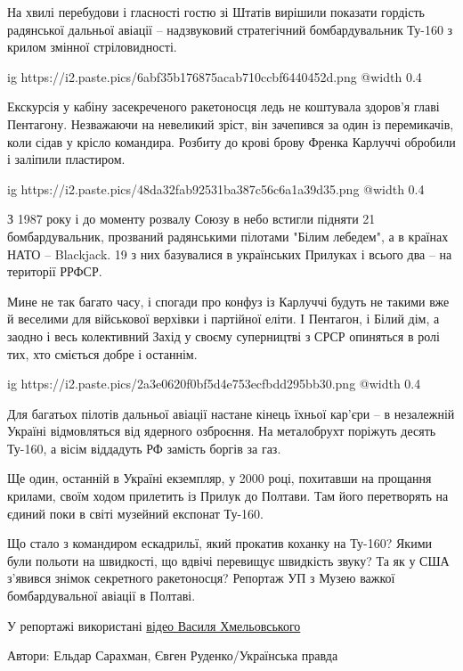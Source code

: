 \begin{itemize}
\begin{multicols}{2}
На хвилі перебудови і гласності гостю зі Штатів вирішили показати гордість
радянської дальньої авіації – надзвуковий стратегічний бомбардувальник Ту-160 з
крилом змінної стріловидності.

\ifcmt
  ig https://i2.paste.pics/6abf35b176875acab710ccbf6440452d.png
  @width 0.4
\fi

Екскурсія у кабіну засекреченого ракетоносця ледь не коштувала здоров'я главі
Пентагону. Незважаючи на невеликий зріст, він зачепився за один із перемикачів,
коли сідав у крісло командира. Розбиту до крові брову Френка Карлуччі обробили
і заліпили пластиром.

\ifcmt
  ig https://i2.paste.pics/48da32fab92531ba387c56c6a1a39d35.png
  @width 0.4
\fi

З 1987 року і до моменту розвалу Союзу в небо встигли підняти 21
бомбардувальник, прозваний радянськими пілотами "Білим лебедем", а в країнах
НАТО – Blackjack. 19 з них базувалися в українських Прилуках і всього два – на
території РРФСР.

Мине не так багато часу, і спогади про конфуз із Карлуччі будуть не такими вже
й веселими для військової верхівки і партійної еліти. І Пентагон, і Білий дім,
а заодно і весь колективний Захід у своєму суперництві з СРСР опиняться в ролі
тих, хто сміється добре і останнім.

\ifcmt
  ig https://i2.paste.pics/2a3e0620f0bf5d4e753ecfbdd295bb30.png
  @width 0.4
\fi

Для багатьох пілотів дальньої авіації настане кінець їхньої кар'єри – в
незалежній Україні відмовляться від ядерного озброєння. На металобрухт поріжуть
десять Ту-160, а вісім віддадуть РФ замість боргів за газ.

Ще один, останній в Україні екземпляр, у 2000 році, похитавши на прощання
крилами, своїм ходом прилетить із Прилук до Полтави. Там його перетворять на
єдиний поки в світі музейний експонат Ту-160.

Що стало з командиром ескадрильї, який прокатив коханку на Ту-160? Якими були
польоти на швидкості, що вдвічі перевищує швидкість звуку? Та як у США з’явився
знімок секретного ракетоносця? Репортаж УП з Музею важкої бомбардувальної
авіації в Полтаві.

У репортажі використані 
\href{https://www.youtube.com/c/ВасилийХмелевский/featured}{%
відео Василя Хмельовського %
}

Автори: Ельдар Сарахман, Євген Руденко/Українська правда



\end{multicols}
\end{itemize}
